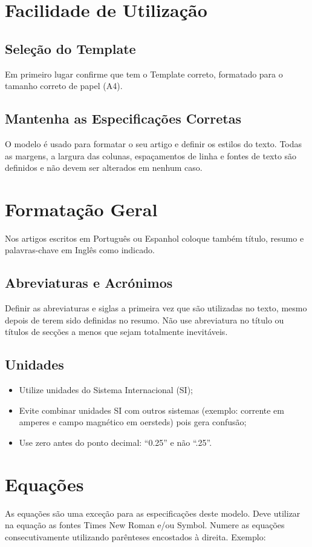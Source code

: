 \documentclass[conference]{IEEEtran}
\begin{document}
\section{Facilidade de Utilização}

\subsection{Seleção do Template}
Em primeiro lugar confirme que tem o Template correto, formatado para o tamanho correto de papel (A4).

\subsection{Mantenha as Especificações Corretas}
O modelo é usado para formatar o seu artigo e definir os estilos do texto. Todas as margens, a largura das colunas, espaçamentos 
de linha e fontes de texto são definidos e não devem ser alterados em nenhum caso.

\section{Formatação Geral}
Nos artigos escritos em Português ou Espanhol coloque também título, resumo e palavras-chave em Inglês como indicado.

\subsection{Abreviaturas e Acrónimos}
Definir as abreviaturas e siglas a primeira vez que são utilizadas no texto, mesmo depois de terem sido definidas no resumo. Não 
use abreviatura no título ou títulos de secções a menos que sejam totalmente inevitáveis.

\subsection{Unidades}
\begin{itemize}
    \item Utilize unidades do Sistema Internacional (SI);
    \item Evite combinar unidades SI com outros sistemas (exemplo: corrente em amperes e campo magnético em oersteds) pois gera confusão;
    \item Use zero antes do ponto decimal: “0.25” e não “.25”.
\end{itemize}

\section{Equações}
As equações são uma exceção para as especificações deste modelo. Deve utilizar na equação as fontes Times New Roman e/ou Symbol. 
Numere as equações consecutivamente utilizando parênteses encostados à direita. Exemplo:
\end{document}
